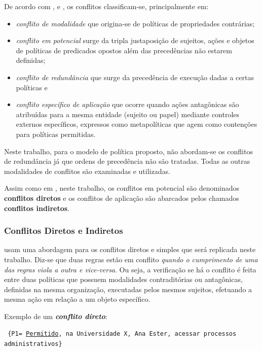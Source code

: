 \documentclass[
	12pt,				%
	openright,			%
	oneside,			%
	a4paper,			%
	english,			%
	french,				%
	spanish,			%
	brazil				%
	]{abntex2}
\begin{document}
De acordo com ,  e , os conflitos classificam-se, principalmente em: \begin{itemize}
	\item \textit{conflito de modalidade} que origina-se de políticas de propriedades contrárias; 
	\item \textit{conflito em potencial} surge da tripla justaposição de sujeitos, ações e objetos de políticas de predicados opostos além das precedências não estarem definidas;
	\item \textit{conflito de redundância} que surge da precedência de execução dadas a certas políticas e
	\item \textit{conflito específico de aplicação} que ocorre quando ações antagônicas são atribuídas para a mesma entidade (sujeito ou papel) mediante controles externos específicos, expressos como metapolíticas que agem como contenções para políticas permitidas.
\end{itemize}

Neste trabalho, para o modelo de política proposto, não abordam-se os conflitos de redundância já que ordens de precedência não são tratadas. Todas as outras modalidades de conflitos são examinadas e utilizadas.

Assim como em , neste trabalho, os conflitos em potencial são denominados \textbf{conflitos diretos} e os conflitos de aplicação são abarcados pelos chamados \textbf{conflitos indiretos}.

\subsubsection{Conflitos Diretos e Indiretos}
 usam uma abordagem para os conflitos diretos e simples que será replicada neste trabalho. Diz-se que duas regras estão em conflito \textit{quando o cumprimento de uma das regras viola a outra e vice-versa}. Ou seja, a verificação se há o conflito é feita entre duas políticas que possuem modalidades contraditórias ou antagônicas, definidas na mesma organização, executadas pelos mesmos sujeitos, efetuando a mesma ação em relação a um objeto específico.

Exemplo de um \textit{\textbf{conflito direto}}:

{\scriptsize \texttt{ \{P1= {\underline{Permitido}, na Universidade X, Ana Ester, acessar processos administrativos\} }}}
\end{document}
